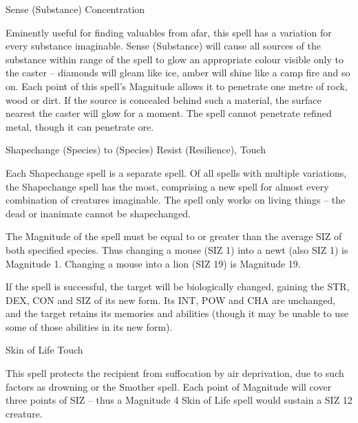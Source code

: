 \begin{rpg-spell}
{Sense (Substance)}
{Concentration}

Eminently useful for finding valuables from afar, this spell has a variation for every substance imaginable. Sense (Substance) will cause all sources of the substance within range of the spell to glow an appropriate colour visible only to the caster – diamonds will gleam like ice, amber will shine like a camp fire and so on. Each point of this spell’s Magnitude allows it to penetrate one metre of rock, wood or dirt. If the source is concealed behind such a material, the surface nearest the caster will glow for a moment. The spell cannot penetrate refined metal, though it can penetrate ore. 
\end{rpg-spell}


\begin{rpg-spell}
{Shapechange (Species) to (Species)}
{Resist (Resilience), Touch}

Each Shapechange spell is a separate spell. Of all spells with multiple variations, the Shapechange spell has the most, comprising a new spell for almost every combination of creatures imaginable. The spell only works on living things – the dead or inanimate cannot be shapechanged. 

The Magnitude of the spell must be equal to or greater than the average SIZ of both specified species. Thus changing a mouse (SIZ 1) into a newt (also SIZ 1) is Magnitude 1. Changing a mouse into a lion (SIZ 19) is Magnitude 19. 

If the spell is successful, the target will be biologically changed, gaining the STR, DEX, CON and SIZ of its new form. Its INT, POW and CHA are unchanged, and the target retains its memories and abilities (though it may be unable to use some of those abilities in its new form). 
\end{rpg-spell}


\begin{rpg-spell}
{Skin of Life}
{Touch}

This spell protects the recipient from suffocation by air deprivation, due to such factors as drowning or the Smother spell. Each point of Magnitude will cover three points of SIZ – thus a Magnitude 4 Skin of Life spell would sustain a SIZ 12 creature. 
\end{rpg-spell}


